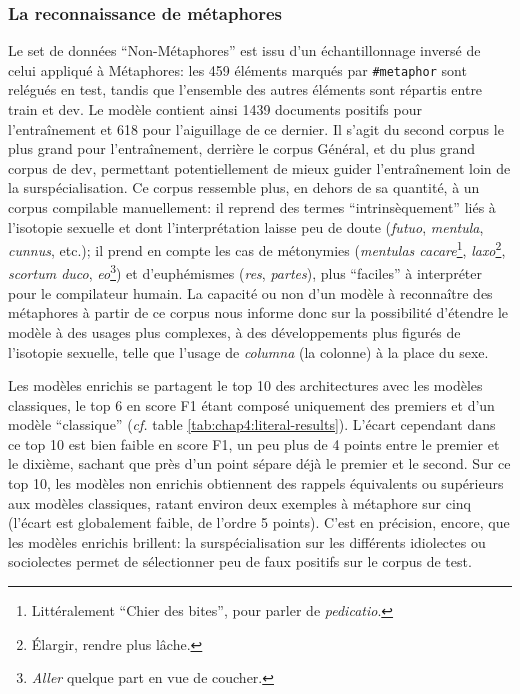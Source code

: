 
\subsubsection{La reconnaissance de métaphores}

Le set de données \enquote{Non-Métaphores} est issu d'un échantillonnage inversé de celui appliqué à Métaphores: les 459 éléments marqués par \texttt{\#metaphor} sont relégués en test, tandis que l'ensemble des autres éléments sont répartis entre train et dev. Le modèle contient ainsi 1439 documents positifs pour l'entraînement et 618 pour l'aiguillage de ce dernier. Il s'agit du second corpus le plus grand pour l'entraînement, derrière le corpus Général, et du plus grand corpus de dev, permettant potentiellement de mieux guider l'entraînement loin de la surspécialisation. Ce corpus ressemble plus, en dehors de sa quantité, à un corpus compilable manuellement: il reprend des termes \enquote{intrinsèquement} liés à l'isotopie sexuelle et dont l'interprétation laisse peu de doute (\textit{futuo}, \textit{mentula}, \textit{cunnus}, etc.); il prend en compte les cas de métonymies (\textit{mentulas cacare}\footnote{Littéralement \enquote{Chier des bites}, pour parler de \textit{pedicatio}.}, \textit{laxo}\footnote{Élargir, rendre plus lâche.}, \textit{scortum duco}, \textit{eo}\footnote{\textit{Aller} quelque part en vue de coucher.}) et d'euphémismes (\textit{res}, \textit{partes}), plus \enquote{faciles} à interpréter pour le compilateur humain. La capacité ou non d'un modèle à reconnaître des métaphores à partir de ce corpus nous informe donc sur la possibilité d'étendre le modèle à des usages plus complexes, à des développements plus figurés de l'isotopie sexuelle, telle que l'usage de \textit{columna} (la colonne) à la place du sexe.


Les modèles enrichis se partagent le top 10 des architectures avec les modèles classiques, le top 6 en score F1 étant composé uniquement des premiers et d'un modèle \enquote{classique} (\textit{cf.} table \ref{tab:chap4:literal-results}). L'écart cependant dans ce top 10 est bien faible en score F1, un peu plus de 4 points entre le premier et le dixième, sachant que près d'un point sépare déjà le premier et le second. Sur ce top 10, les modèles non enrichis obtiennent des rappels équivalents ou supérieurs aux modèles classiques, ratant environ deux exemples à métaphore sur cinq (l'écart est globalement faible, de l'ordre 5 points). C'est en précision, encore, que les modèles enrichis brillent: la surspécialisation sur les différents idiolectes ou sociolectes permet de sélectionner peu de faux positifs sur le corpus de test.

